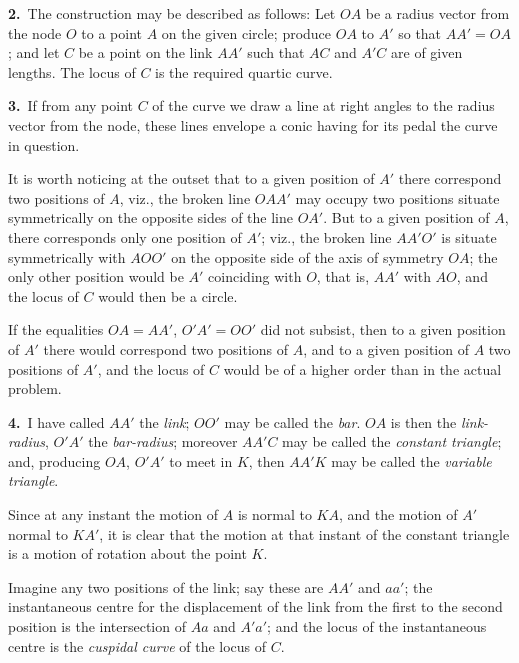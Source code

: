 \documentclass[11pt,a4paper]{article}
\begin{document}
\textbf{2.}\ The construction may be described as follows: Let $OA$ be a radius vector from the node $O$ to a point $A$ on the given circle; produce $OA$ to $A'$ so that $AA' = OA$; and let $C$ be a point on the link $AA'$ such that $AC$ and $A'C$ are of given lengths. The locus of $C$ is the required quartic curve.

\textbf{3.}\ If from any point $C$ of the curve we draw a line at right angles to the radius vector from the node, these lines envelope a conic having for its pedal the curve in question.

It is worth noticing at the outset that to a given position of $A'$ there correspond two positions of $A$, viz., the broken line $OAA'$ may occupy two positions situate symmetrically on the opposite sides of the line $OA'$. But to a given position of $A$, there corresponds only one position of $A'$; viz., the broken line $AA'O'$ is situate symmetrically with $AOO'$ on the opposite side of the axis of symmetry $OA$; the only other position would be $A'$ coinciding with $O$, that is, $AA'$ with $AO$, and the locus of $C$ would then be a circle.

If the equalities $OA = AA'$, $O'A' = OO'$ did not subsist, then to a given position of $A'$ there would correspond two positions of $A$, and to a given position of $A$ two positions of $A'$, and the locus of $C$ would be of a higher order than in the actual problem.


\newpage
\setcounter{page}{184}

\noindent\textbf{4.}\ I have called $AA'$ the \textit{link}; $OO'$ may be called the \textit{bar}. $OA$ is then the \textit{link-radius}, $O'A'$ the \textit{bar-radius}; moreover $AA'C$ may be called the \textit{constant triangle}; and, producing $OA$, $O'A'$ to meet in $K$, then $AA'K$ may be called the \textit{variable triangle}.

Since at any instant the motion of $A$ is normal to $KA$, and the motion of $A'$ normal to $KA'$, it is clear that the motion at that instant of the constant triangle is a motion of rotation about the point $K$.

Imagine any two positions of the link; say these are $AA'$ and $aa'$; the instantaneous centre for the displacement of the link from the first to the second position is the intersection of $Aa$ and $A'a'$; and the locus of the instantaneous centre is the \textit{cuspidal curve} of the locus of $C$.
\end{document}
